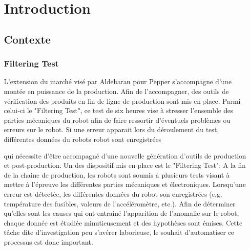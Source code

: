 \chapter{Introduction}
\label{Introduction}
\thispagestyle{fancy}

\section{Contexte}
\label{Introduction:Contexte}

\subsection{Filtering Test}
\label{Introduction:Contexte:Filtering Test}
L'extension du marché visé par Aldebaran pour Pepper s'accompagne d'une montée en puissance de la production. Afin de l'accompagner, des outils de vérification des produits en fin de ligne de production sont mis en place. Parmi celui-ci le "Filtering Test", ce test de six heures vise à stresser l'ensemble des parties mécaniques du robot afin de faire ressortir d'éventuels problèmes ou erreurs sur le robot. Si une erreur apparait lors du déroulement du test, différentes données du robots robot sont enregistrées 


 qui nécessite d'être accompagné d'une nouvelle génération d'outils de production et post-production. Un des dispositif mis en place est le "Filtering Test": A la fin de la chaine de production, les robots sont soumis à plusieurs tests visant à mettre à l'épreuve les différentes parties mécaniques et électroniques. Lorsqu'une erreur est détectée,  les différentes données du robot son enregistrées (e.g. température des fusibles, valeurs de l'accéléromètre, etc.). Afin de déterminer qu'elles sont les causes qui ont entrainé l'apparition de l'anomalie sur le robot, chaque donnée est étudiée minutieusement et des hypothèses sont émises. Cette tâche dite d'investigation peu s'avérer laborieuse, le souhait d'automatiser ce processus est donc important.